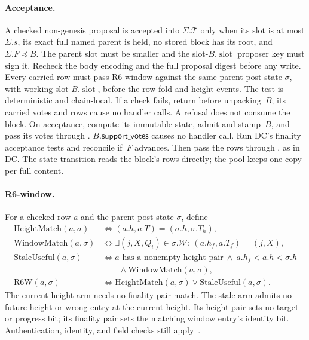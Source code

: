 \documentclass{article}
\theoremstyle{plain}
\theoremstyle{definition}
\theoremstyle{remark}
\newcommand{\slot}{\operatorname{slot}}
\newcommand{\supportf}{\mathsf{support\_votes}}
\newcommand{\T}{\mathcal T}
\newcommand{\fname}[1]{\text{\textsc{#1}}}
\begin{document}
\paragraph{Acceptance.}\label{par:acceptance}
A checked non-genesis proposal is accepted into $\Sigma.\T$ only when its
slot is at most $\Sigma.s$, its exact full named parent is held, no stored
block has its root, and $\Sigma.F\preceq B$. The parent slot must be smaller
and the slot-$B.\slot$ proposer key must sign it. Recheck the body encoding
and the full proposal digest before any write. Every carried row must pass
R6-window against the same parent post-state $\sigma$, with working slot
$B.\slot$, before the row fold and height events. The test is deterministic
and chain-local. If a check fails, return before unpacking~$B$;
its carried votes and rows cause no handler calls.  A refusal does not
consume the block.  On acceptance, compute its immutable state, admit
and stamp~$B$, and pass its votes through \fname{on\_goldfish\_vote}.
$B.\supportf$ causes no handler call.  Run DC's finality acceptance
tests and reconcile if~$F$ advances.  Then pass the rows through
\fname{on\_attestation}, as in DC.  The state transition reads the
block's rows directly; the pool keeps one copy per full content.

\paragraph{R6-window.}\label{par:r6-window}
For a checked row $a$ and the parent post-state $\sigma$, define
\[
\begin{aligned}
 \mathrm{HeightMatch}(a,\sigma)&\iff(a.h,a.T)=(\sigma.h,\sigma.T_h),\\
 \mathrm{WindowMatch}(a,\sigma)&\iff
   \exists(j,X,Q_i)\in\sigma.\mathcal{W}:\ (a.h_f,a.T_f)=(j,X),\\
 \mathrm{StaleUseful}(a,\sigma)&\iff
   a\text{ has a nonempty height pair}\ \land\ a.h_f<a.h<\sigma.h\\
   &\qquad\land\mathrm{WindowMatch}(a,\sigma),\\
 \mathrm{R6W}(a,\sigma)&\iff
   \mathrm{HeightMatch}(a,\sigma)\lor\mathrm{StaleUseful}(a,\sigma).
\end{aligned}
\]
The current-height arm needs no finality-pair match.  The stale arm
admits no future height or wrong entry at the current height.
Its height pair sets no target or progress bit; its finality pair sets
the matching window entry's identity bit.  Authentication, identity,
and field checks still apply~\cite[\S2]{FW}.
\end{document}
